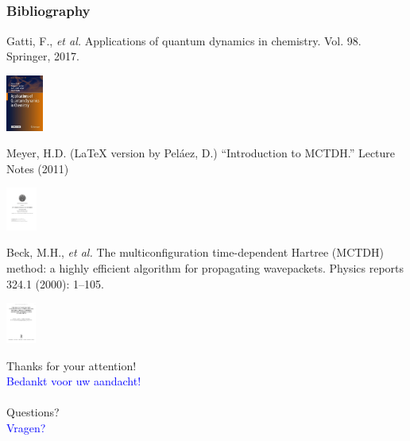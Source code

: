 \documentclass{beamer}
\begin{document}
\subsection[Bibliography]{}\label{biblio}

\begin{frame}
  \frametitle{Bibliography}
  \centering
  \begin{minipage}{.6\linewidth}
\small{Gatti, F., \emph{et al.} Applications of quantum dynamics in chemistry. Vol. 98.
  Springer, 2017.}
\end{minipage}
\hspace{1cm}
  \begin{minipage}{.1\linewidth}
\includegraphics[width=3.3em]{appli.jpg}
\end{minipage}

\vspace{.5cm}

  \begin{minipage}{.6\linewidth}
\small{Meyer, H.D. (\LaTeX{} version by Pel\'aez, D.) ``Introduction to MCTDH.'' Lecture Notes (2011)}
 \end{minipage}
 \hspace{1cm}
   \begin{minipage}{.1\linewidth}
 \includegraphics[width=2.7em, cfbox=black]{int_dan.pdf}
\end{minipage}
  
\vspace{.5cm}

  \begin{minipage}{.6\linewidth}
\small{Beck, M.H., \emph{et al.} The multiconfiguration time-dependent Hartree (MCTDH) method: a highly efficient algorithm for propagating wavepackets. Physics reports 324.1 (2000): 1--105.}
\end{minipage}
\hspace{1cm}
  \begin{minipage}{.1\linewidth}
\includegraphics[width=2.7em, cfbox=black]{mctdh_rev.png}
  \end{minipage}
\end{frame}

\begin{frame}
  \centering \Large
  Thanks for your attention!\\
  \textcolor{blue}{Bedankt voor uw aandacht!}\\~\\
  Questions?\\
  \textcolor{blue}{Vragen?}
\end{frame}
\end{document}
